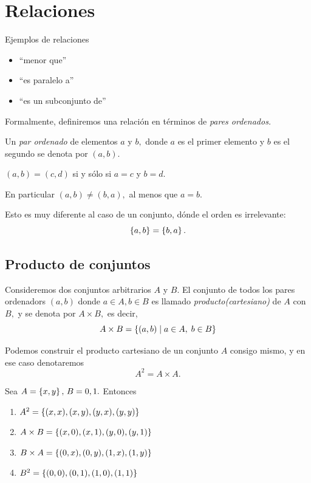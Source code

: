 \section{Relaciones}


	{Ejemplos de relaciones}
	\begin{itemize}
		\item ``menor que''
		\item ``es paralelo a''
		\item ``es un subconjunto de''
	\end{itemize}
	



	Formalmente, definiremos una relaci\'on en t\'erminos de \emph{pares ordenados.}



	\begin{defn}
		Un \emph{par ordenado} de elementos $a$ y $b,$ donde $a$ es el primer elemento y $b$ es el segundo se denota por $(a,b).$
	\end{defn}
	



	
	\begin{ax}
		$(a,b)=(c,d)$  si y s\'olo si $a=c$ y
		$b=d.$
	\end{ax}
	
	
	
	En particular $(a,b)\neq(b,a),$  al menos que $a=b.$
	
	
	
	Esto es muy diferente al caso de un conjunto, d\'onde el orden es irrelevante:
	$$
	\left\{ a,b \right\}=\left\{ b,a \right\}.
	$$


\subsection{Producto de conjuntos}


	Consideremos dos conjuntos arbitrarios $A$ y $B.$ El conjunto de todos los pares ordenadors $(a,b)$ donde $a\in A, b \in B$ es llamado \emph{producto(cartesiano)} de $A$ con $B,$ y se denota por $A \times B,$ es decir,
	$$
	A \times B = \left\{ (a,b) \mid a \in A, \; b \in B \right\}
	$$



	Podemos construir el producto cartesiano de un conjunto $A$ consigo mismo, y en ese caso denotaremos
	$$A^{2}= A\times A.$$



	\begin{exmp}
		Sea $A=\left\{ x,y \right\}, \, B={0,1}.$ Entonces
		\begin{enumerate}
			\item $A^{2}=\left\{ (x,x), (x,y), (y,x), (y,y) \right\}$
			\item $A\times B= \left\{ (x,0), (x,1), (y,0), (y,1) \right\}$
			\item $B\times A= \left\{ (0,x), (0,y), (1, x), (1,y) \right\}$
			\item $B^2=\left\{ (0,0), (0,1), (1,0), (1,1) \right\}$
		\end{enumerate}
		
	\end{exmp}
	



